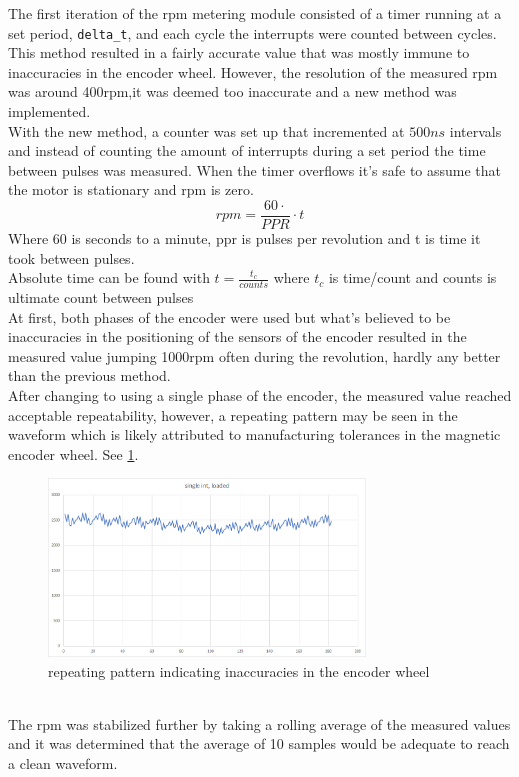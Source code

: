 \documentclass{article}
\begin{document}
The first iteration of the rpm metering module consisted of a timer running at a set period, \verb!delta_t!, and each cycle the interrupts were counted between cycles. This method resulted in a fairly accurate value that was mostly immune to inaccuracies in the encoder wheel. However, the resolution of the measured rpm was around 400rpm,it was deemed too inaccurate and a new method was implemented.
\\
With the new method, a counter was set up that incremented at $500ns$ intervals and instead of counting the amount of interrupts during a set period the time between pulses was measured. When the timer overflows it's safe to assume that the motor is stationary and rpm is zero. 
\[ rpm=\frac{60\cdot} {PPR} \cdot t\]
Where 60 is seconds to a minute, ppr is pulses per revolution and t is time it took between pulses. 
\\
Absolute time can be found with \(t = \frac{t_c}{counts}\)  where $t_c$ is time/count and counts is ultimate count between pulses 
\\
At first, both phases of the encoder were used but what's believed to be inaccuracies in the positioning of the sensors of the encoder resulted in the measured value jumping 1000rpm often during the revolution, hardly any better than the previous method.
\\
After changing to using a single phase of the encoder, the measured value reached acceptable repeatability, however, a repeating pattern may be seen in the waveform which is  likely attributed to manufacturing tolerances in the magnetic encoder wheel. See \ref{fig:distortedRpm}.

\begin{figure}[h!t]
    \centering
    \includegraphics[width=0.75\textwidth]{Project3ControllerStateMachine/rpm_distortions.png}
    \caption{repeating pattern indicating inaccuracies in the encoder wheel}
    \label{fig:distortedRpm}
\end{figure}
\\
The rpm was stabilized further by taking a rolling average of the measured values and it was determined that the average of 10 samples would be adequate to reach a clean waveform.
\\
\end{document}
